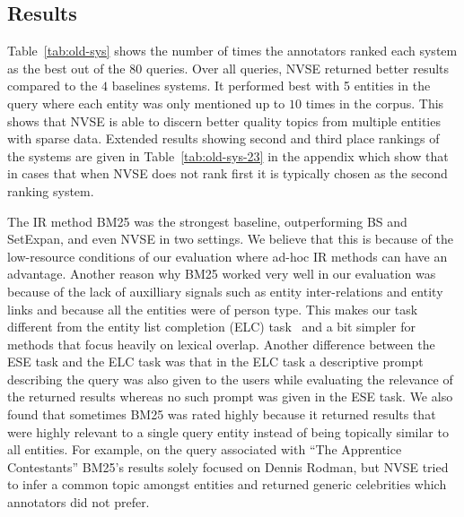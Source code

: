 \documentclass[a4paper]{article}
\newcommand{\tabref}[1]{Table~\ref{#1}}
\newcommand{\setX}{SetExpan\xspace}
\newcommand{\nvge}{NVSE\xspace}
\begin{document}
\subsection{Results}
\tabref{tab:old-sys} %
shows the number of times the
annotators ranked each system as the best out of the $80$ queries. Over all queries, \nvge returned better results compared to the $4$ baselines systems. It performed best with 5 entities in the query where each entity was only mentioned up to $10$ times in the corpus. This shows that \nvge is able to discern better quality topics from multiple entities with sparse data. Extended results showing second and third place rankings of the systems are given in \tabref{tab:old-sys-23} in the appendix which show that in cases that when NVSE does not rank first it is typically chosen as the second ranking system.

The IR method BM25 was the strongest baseline, outperforming BS and \setX, and even \nvge in two settings. We believe that this is because of the low-resource conditions of our evaluation where ad-hoc IR methods can have an advantage. Another reason why BM25 worked very well in our evaluation was because of the lack of auxilliary signals such as entity inter-relations and entity links and  because all the entities were of person type. This makes our task different from the entity list completion (ELC) task~\cite{balog2009overview} and a bit simpler for methods that focus heavily on lexical overlap. Another difference between the ESE task and the ELC task was that in the ELC task a descriptive prompt describing the query was also given to the users while evaluating the relevance of the returned results whereas no such prompt was given in the ESE task. We also found that sometimes BM25 was rated highly because it returned results that were highly relevant to a single  query entity instead of being topically similar to all entities. For example, on the query associated with ``The Apprentice Contestants'' BM25's results solely focused on Dennis Rodman, but \nvge tried to infer a common topic amongst entities and returned generic celebrities which annotators did not prefer.
\end{document}
